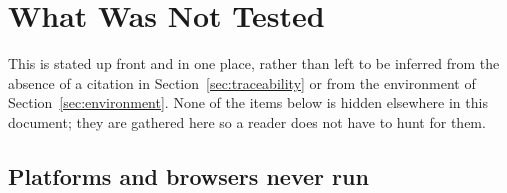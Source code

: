 \section{What Was Not Tested}
\label{sec:untested}

This is stated up front and in one place, rather than left to be inferred from the
absence of a citation in Section~\ref{sec:traceability} or from the environment of
Section~\ref{sec:environment}.  None of the items below is hidden elsewhere in this
document; they are gathered here so a reader does not have to hunt for them.

\subsection{Platforms and browsers never run}

